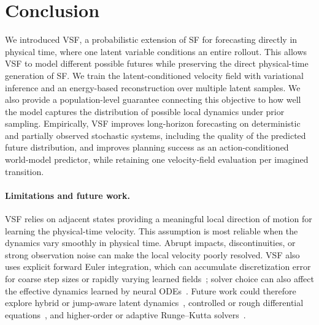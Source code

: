 \section{Conclusion}

We introduced VSF, a probabilistic extension of SF for forecasting directly in
physical time, where one latent variable conditions an entire rollout. This
allows VSF to model different possible futures while preserving the direct
physical-time generation of SF. We train the latent-conditioned velocity field
with variational inference and an energy-based reconstruction over multiple
latent samples. We also provide a population-level guarantee connecting this
objective to how well the model captures the distribution of possible local
dynamics under prior sampling. Empirically, VSF improves long-horizon
forecasting on deterministic and partially observed stochastic systems,
including the quality of the predicted future distribution, and improves
planning success as an action-conditioned world-model predictor, while
retaining one velocity-field evaluation per imagined transition.

\paragraph{Limitations and future work.} VSF relies on adjacent states providing a meaningful local direction of motion for learning the physical-time velocity. This assumption is most reliable when the dynamics vary smoothly in physical time. Abrupt impacts, discontinuities, or strong observation noise can make the local velocity poorly resolved. VSF also uses explicit forward Euler integration, which can accumulate discretization error for coarse step sizes or rapidly varying learned fields~\citep{hairer1993solving}; solver choice can also affect the effective dynamics learned by neural ODEs~\citep{zhu2022numerical}. Future work could therefore explore hybrid or jump-aware latent dynamics~\citep{jia2019neural},
controlled or rough differential equations~\citep{kidger2020neural,morrill2021neural}, and higher-order or
adaptive Runge--Kutta solvers~\citep{queiruga2020continuous}.




